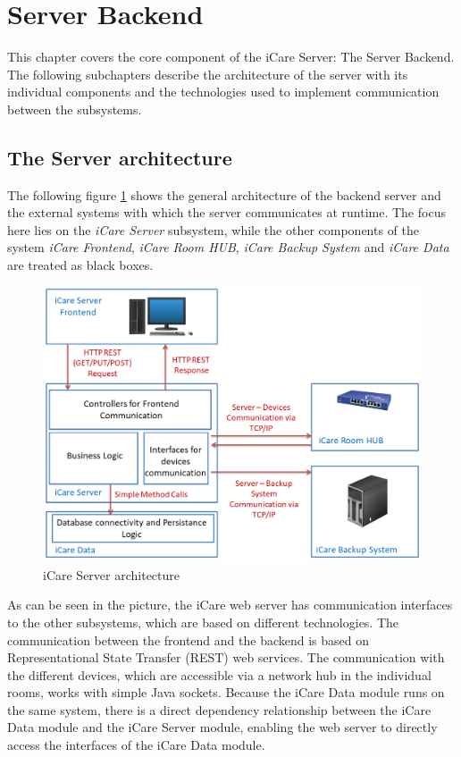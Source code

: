 \section{Server Backend}
This chapter covers the core component of the iCare Server: The Server Backend. The following subchapters describe the architecture of the server with its individual components and the technologies used to implement communication between the subsystems.
\subsection{The Server architecture}
The following figure \ref{icare-serverarchitecure} shows the general architecture of the backend server and the external systems with which the server communicates at runtime. The focus here lies on the \textit{iCare Server} subsystem, while the other components of the system \textit{iCare Frontend}, \textit{iCare Room HUB}, \textit{iCare Backup System} and \textit{iCare Data} are treated as black boxes. 
\begin{figure}[H]
	\centering
	\includegraphics[width =1.0\textwidth]{images/server-architecture.PNG}
	\caption{iCare Server architecture}
	\label{icare-serverarchitecure}
\end{figure}
As can be seen in the picture, the iCare web server has communication interfaces to the other subsystems, which are based on different technologies. The communication between the frontend and the backend is based on Representational State Transfer (REST) web services. The communication with the different devices, which are accessible via a network hub in the individual rooms, works with simple Java sockets. Because the iCare Data module runs on the same system, there is a direct dependency relationship between the iCare Data module and the iCare Server module, enabling the web server to directly access the interfaces of the iCare Data module.
